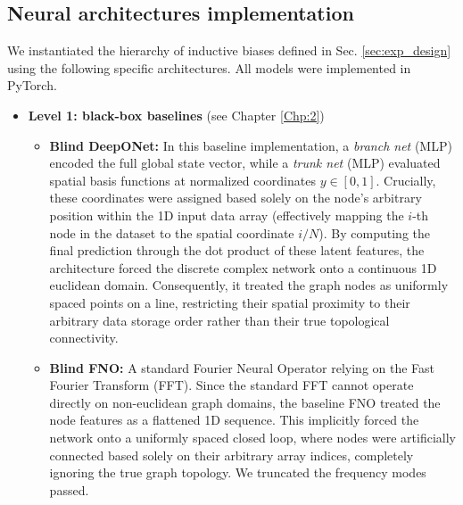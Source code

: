 \subsection{Neural architectures implementation}

We instantiated the hierarchy of inductive biases defined in Sec. \ref{sec:exp_design} using the following specific architectures. All models were implemented in PyTorch.

\begin{itemize}
    \item \textbf{Level 1: black-box baselines} (see Chapter \ref{Chp:2}) %
    \begin{itemize}
        \item \textbf{Blind DeepONet:} In this baseline implementation, a \textit{branch net} (MLP) encoded the full global state vector, while a \textit{trunk net} (MLP) evaluated spatial basis functions at normalized coordinates $y \in [0,1]$. Crucially, these coordinates were assigned based solely on the node's arbitrary position within the 1D input data array (effectively mapping the $i$-th node in the dataset to the spatial coordinate $i/N$). By computing the final prediction through the dot product of these latent features, the architecture forced the discrete complex network onto a continuous 1D euclidean domain. Consequently, it treated the graph nodes as uniformly spaced points on a line, restricting their spatial proximity to their arbitrary data storage order rather than their true topological connectivity.
        \item \textbf{Blind FNO:} A standard Fourier Neural Operator relying on the Fast Fourier Transform (FFT).
        Since the standard FFT cannot operate directly on non-euclidean graph domains, the baseline FNO treated the node features as a flattened 1D sequence. This implicitly forced the network onto a uniformly spaced closed loop, where nodes were artificially connected based solely on their arbitrary array indices, completely ignoring the true graph topology.
         We truncated the frequency modes passed.
    \end{itemize}



\end{itemize}

